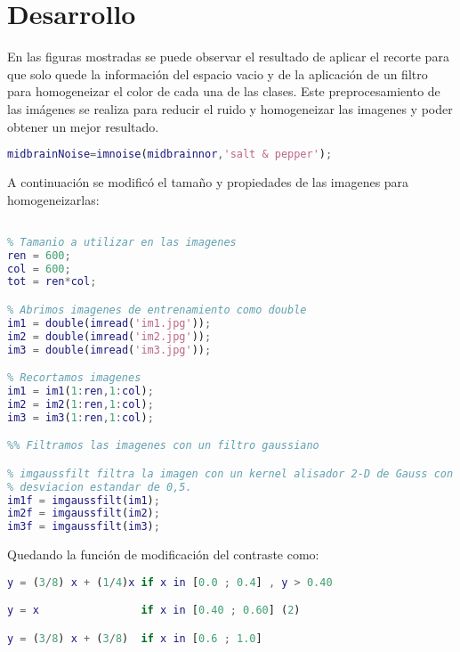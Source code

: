 \documentclass[10pt,journal,compsoc]{IEEEtran}\usepackage[T1]{fontenc}                              %
\begin{document}
 
\hfill

\section{Desarrollo}



En las figuras mostradas se puede observar el resultado de aplicar el recorte para que solo quede la información del espacio vacio y de la aplicación  de un filtro para homogeneizar el color de cada una de las clases.
Este preprocesamiento de las imágenes se realiza para reducir el ruido y homogeneizar las imagenes y poder obtener un mejor resultado.

\begin{lstlisting}[language=Matlab,basicstyle=\small]
midbrainNoise=imnoise(midbrainnor,'salt & pepper');
\end{lstlisting}

A continuación se modificó el tamaño y propiedades de las imagenes para homogeneizarlas:

\begin{lstlisting}[language=Matlab, basicstyle=\small]

% Tamanio a utilizar en las imagenes
ren = 600;
col = 600;
tot = ren*col;

% Abrimos imagenes de entrenamiento como double
im1 = double(imread('im1.jpg'));
im2 = double(imread('im2.jpg'));
im3 = double(imread('im3.jpg'));

% Recortamos imagenes
im1 = im1(1:ren,1:col);
im2 = im2(1:ren,1:col);
im3 = im3(1:ren,1:col);

%% Filtramos las imagenes con un filtro gaussiano

% imgaussfilt filtra la imagen con un kernel alisador 2-D de Gauss con
% desviacion estandar de 0,5.
im1f = imgaussfilt(im1);
im2f = imgaussfilt(im2);
im3f = imgaussfilt(im3);

\end{lstlisting}

Quedando la función de modificación del contraste como:

\begin{lstlisting}[language=Matlab,basicstyle=\small]
y = (3/8) x + (1/4)x if x in [0.0 ; 0.4] , y > 0.40

y = x                if x in [0.40 ; 0.60] (2)

y = (3/8) x + (3/8)  if x in [0.6 ; 1.0]
\end{lstlisting}
\end{document}
